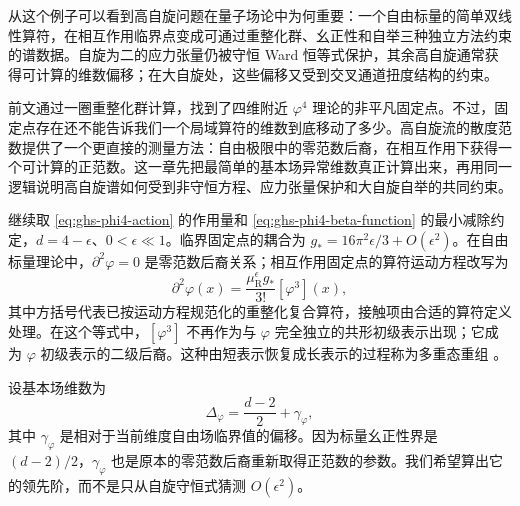 从这个例子可以看到高自旋问题在量子场论中为何重要：一个自由标量的简单双线性算符，在相互作用临界点变成可通过重整化群、幺正性和自举三种独立方法约束的谱数据。自旋为二的应力张量仍被守恒 Ward 恒等式保护，其余高自旋通常获得可计算的维数偏移；在大自旋处，这些偏移又受到交叉通道扭度结构的约束。


前文通过一圈重整化群计算，找到了四维附近 $\varphi^4$ 理论的非平凡固定点。不过，固定点存在还不能告诉我们一个局域算符的维数到底移动了多少。高自旋流的散度范数提供了一个更直接的测量方法：自由极限中的零范数后裔，在相互作用下获得一个可计算的正范数。这一章先把最简单的基本场异常维数真正计算出来，再用同一逻辑说明高自旋谱如何受到非守恒方程、应力张量保护和大自旋自举的共同约束。


继续取 \cref{eq:ghs-phi4-action} 的作用量和 \cref{eq:ghs-phi4-beta-function} 的最小减除约定，$d=4-\epsilon$、$0<\epsilon\ll1$。临界固定点的耦合为 $g_*=16\pi^2\epsilon/3+O(\epsilon^2)$。在自由标量理论中，$\partial^2\varphi=0$ 是零范数后裔关系；相互作用固定点的算符运动方程改写为
\begin{equation}\label{eq:ghs-wf-eom-renormalized}
 \partial^2\varphi(x)=\frac{\mu_{\mathrm R}^{\epsilon}g_*}{3!}[\varphi^3](x),
\end{equation}
其中方括号代表已按运动方程规范化的重整化复合算符，接触项由合适的算符定义处理。在这个等式中，$[\varphi^3]$ 不再作为与 $\varphi$ 完全独立的共形初级表示出现；它成为 $\varphi$ 初级表示的二级后裔。这种由短表示恢复成长表示的过程称为多重态重组 \cite{ghs-rychkov-tan}。

设基本场维数为
\begin{equation}\label{eq:ghs-wf-phi-delta}
 \Delta_\varphi=\frac{d-2}{2}+\gamma_\varphi,
\end{equation}
其中 $\gamma_\varphi$ 是相对于当前维度自由场临界值的偏移。因为标量幺正性界是 $(d-2)/2$，$\gamma_\varphi$ 也是原本的零范数后裔重新取得正范数的参数。我们希望算出它的领先阶，而不是只从自旋守恒式猜测 $O(\epsilon^2)$。


